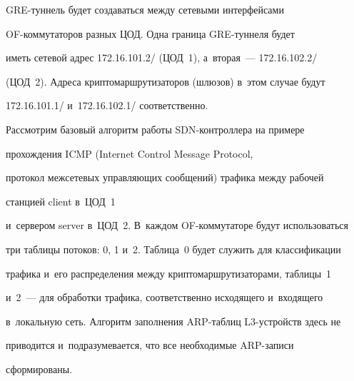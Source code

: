   


  GRE-туннель будет создаваться между сетевыми интерфейсами  


OF-ком\-му\-та\-то\-ров разных ЦОД. Одна граница GRE-тун\-не\-ля будет 


иметь сетевой адрес 172.16.101.2\!/ (ЦОД~1), а~вторая~--- 172.16.102.2\!/ 


(ЦОД~2). Адреса криптомаршрутизаторов (шлюзов) в~этом случае будут 


172.16.101.1\!/ и~172.16.102.1\!/ соответственно.


  


  Рассмотрим базовый алгоритм работы SDN-конт\-рол\-ле\-ра на примере 


прохождения ICMP (Internet Control Message Protocol,


протокол межсетевых управ\-ля\-ющих сообщений) тра\-фи\-ка между рабочей 


станцией client в~ЦОД~1 


и~сервером server в~ЦОД~2. В~каждом OF-коммутаторе будут использоваться 


три таблицы потоков: 0, 1 и~2. Таблица~0 будет служить для классификации 


трафика и~его распределения между криптомаршрутизаторами, таблицы~1 


и~2~--- для обработки трафика, соответственно исходящего и~входящего 


в~локальную сеть. Алгоритм заполнения ARP-таб\-лиц L3-устройств здесь не 


приводится и~подразумевается, что все необходимые ARP-за\-пи\-си 


сформированы.


